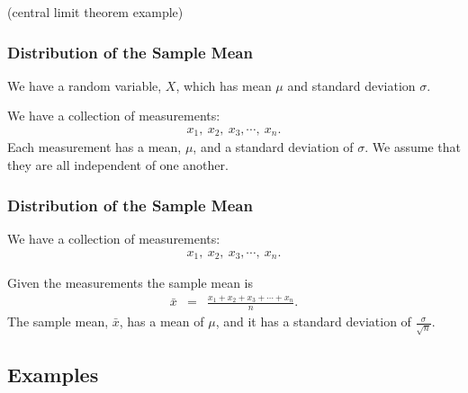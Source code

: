 \begin{frame}
  (central limit theorem example)
\end{frame}


\begin{frame}
  \frametitle{Distribution of the Sample Mean}

  We have a random variable, $X$, which has mean $\mu$ and standard
  deviation $\sigma.$

  \vfill

  We have a collection of measurements:
  \begin{eqnarray*}
    x_1,~x_2,~x_3,\cdots,~x_n.
  \end{eqnarray*}
  Each measurement has a mean, $\mu$, and a standard deviation of
  $\sigma$. We assume that they are all independent of one another.

  \vfill

\end{frame}

\begin{frame}
  \frametitle{Distribution of the Sample Mean}

  We have a collection of measurements:
  \begin{eqnarray*}
    x_1,~x_2,~x_3,\cdots,~x_n.
  \end{eqnarray*}

  \vfill
  
  Given the measurements the sample mean is
  \begin{eqnarray*}
    \bar{x} & = & \frac{x_1+x_2+x_3+\cdots+x_n}{n}.
  \end{eqnarray*}
  The sample mean, $\bar{x}$,  has a mean of $\mu$, and it has a
  standard deviation of $\frac{\sigma}{\sqrt{n}}$.

  \vfill

\end{frame}



\subsection{Examples}

